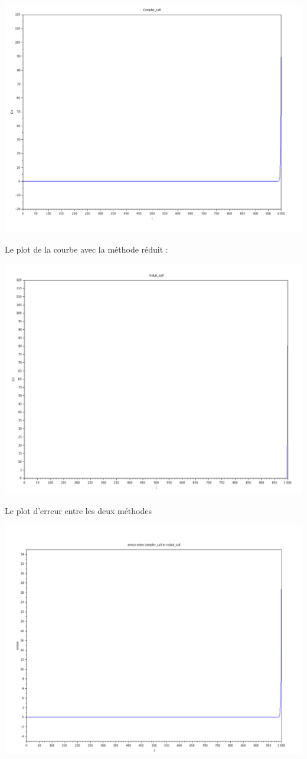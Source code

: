\documentclass[a4paper, 12pt]{article}
\begin{document}
\newpage
\includegraphics[scale=0.8]{Images/complet_call.png} 

Le plot de la courbe avec la méthode réduit :

\includegraphics[scale=0.8]{Images/reduit_call.png} 

Le plot d'erreur entre les deux méthodes

\includegraphics[scale=0.8]{Images/erreur_cc_rc.png} 
\end{document}
